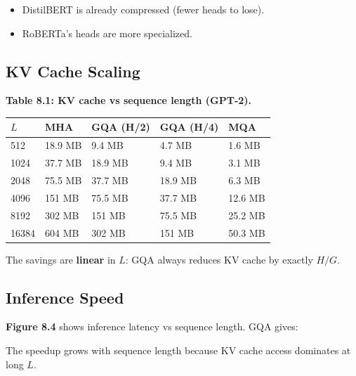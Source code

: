 \begin{itemize}
\item DistilBERT is already compressed (fewer heads to lose).
\item RoBERTa's heads are more specialized.

\end{itemize}
\subsection{KV Cache Scaling}

\textbf{Table 8.1: KV cache vs sequence length (GPT-2).}

\begin{table}[H]
\centering
\small
\begin{tabular}{lllll}
\toprule
\textbf{$L$} & \textbf{MHA} & \textbf{GQA (H/2)} & \textbf{GQA (H/4)} & \textbf{MQA} \\
\midrule
512 & 18.9 MB & 9.4 MB & 4.7 MB & 1.6 MB \\
1024 & 37.7 MB & 18.9 MB & 9.4 MB & 3.1 MB \\
2048 & 75.5 MB & 37.7 MB & 18.9 MB & 6.3 MB \\
4096 & 151 MB & 75.5 MB & 37.7 MB & 12.6 MB \\
8192 & 302 MB & 151 MB & 75.5 MB & 25.2 MB \\
16384 & 604 MB & 302 MB & 151 MB & 50.3 MB \\
\bottomrule
\end{tabular}
\end{table}

The savings are \textbf{linear} in $L$: GQA always reduces KV cache by exactly 
$H / G$.

\subsection{Inference Speed}

\textbf{Figure 8.4} shows inference latency vs sequence length. GQA gives:

The speedup grows with sequence length because KV cache access dominates 
at long $L$.

